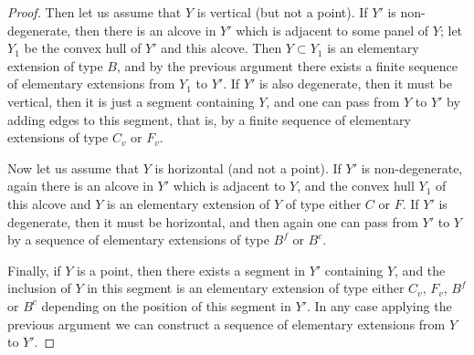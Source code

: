 \documentclass[a4paper, 11pt]{article}
\theoremstyle{plain}
\newtheorem{lemma}[proposition]{Lemma}
\theoremstyle{definition}
\theoremstyle{remark}
\begin{document}
\begin{proof}
Then let us assume that $Y$ is vertical (but not a point). If $Y'$ is non-degenerate, then there is an alcove in $Y'$ which is adjacent to some panel of $Y$; let $Y_1$ be the convex hull of $Y'$ and this alcove. Then $Y\subset Y_1$ is an elementary extension of type $B$, and by the previous argument there exists a finite sequence of elementary extensions from $Y_1$ to $Y'$.
If $Y'$ is also degenerate, then it must be vertical, then it is just a segment containing $Y$, and one can pass from $Y$ to $Y'$ by adding edges to this segment, that is, by a finite sequence of elementary extensions of type $C_v$ or $F_v$.

Now let us assume that $Y$ is horizontal (and not a point). If $Y'$ is non-degenerate, again there is an alcove in $Y'$ which is adjacent to $Y$, and the convex hull $Y_1$ of this alcove and $Y$ is an elementary extension of $Y$ of type either $C$ or $F$.  If $Y'$ is degenerate, then it must be horizontal, and then again one can pass from $Y'$ to $Y$ by a sequence of elementary extensions of type $B^f$ or $B^c$.

Finally, if $Y$ is a point, then there exists a segment in $Y'$ containing $Y$, and  the inclusion of $Y$ in this segment is
an elementary extension of type either $C_v$, $F_v$, $B^f$ or $B^c$ depending on the position of this segment in $Y'$. In any case applying the previous argument we can construct a sequence of elementary extensions from $Y$ to $Y'$.
\end{proof}

\end{document}
